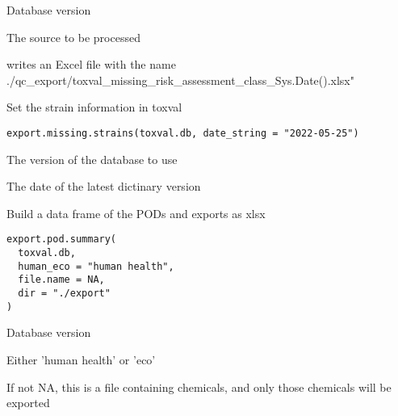 \documentclass[letterpaper]{book}
\begin{document}
%
\begin{Arguments}
\begin{ldescription}
\item[\code{toxval.db}] Database version

\item[\code{source}] The source to be processed
\end{ldescription}
\end{Arguments}
%
\begin{Value}
writes an Excel file with the name
./qc\_export/toxval\_missing\_risk\_assessment\_class\_Sys.Date().xlsx"
\end{Value}
%
\begin{Description}\relax
Set the strain information in toxval
\end{Description}
%
\begin{Usage}
\begin{verbatim}
export.missing.strains(toxval.db, date_string = "2022-05-25")
\end{verbatim}
\end{Usage}
%
\begin{Arguments}
\begin{ldescription}
\item[\code{toxval.db}] The version of the database to use

\item[\code{date\_string}] The date of the latest dictinary version
\end{ldescription}
\end{Arguments}
%
\begin{Description}\relax
Build a data frame of the PODs and exports as xlsx
\end{Description}
%
\begin{Usage}
\begin{verbatim}
export.pod.summary(
  toxval.db,
  human_eco = "human health",
  file.name = NA,
  dir = "./export"
)
\end{verbatim}
\end{Usage}
%
\begin{Arguments}
\begin{ldescription}
\item[\code{toxval.db}] Database version

\item[\code{human\_eco}] Either 'human health' or 'eco'

\item[\code{file.name}] If not NA, this is a file containing chemicals, and only those chemicals will be exported
\end{ldescription}
\end{Arguments}
\end{document}
